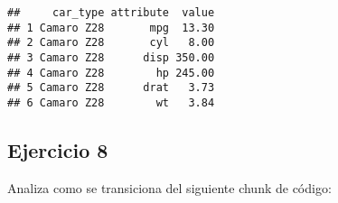 \documentclass[]{book}
\newenvironment{Shaded}{\begin{snugshade}}{\end{snugshade}}
\newcommand{\KeywordTok}[1]{\textcolor[rgb]{0.13,0.29,0.53}{\textbf{#1}}}
\newcommand{\NormalTok}[1]{#1}
\newcommand{\OperatorTok}[1]{\textcolor[rgb]{0.81,0.36,0.00}{\textbf{#1}}}
\newcommand{\StringTok}[1]{\textcolor[rgb]{0.31,0.60,0.02}{#1}}
\begin{document}
\begin{Shaded}
\end{Shaded}

\begin{verbatim}
##     car_type attribute  value
## 1 Camaro Z28       mpg  13.30
## 2 Camaro Z28       cyl   8.00
## 3 Camaro Z28      disp 350.00
## 4 Camaro Z28        hp 245.00
## 5 Camaro Z28      drat   3.73
## 6 Camaro Z28        wt   3.84
\end{verbatim}

\begin{Shaded}
\end{Shaded}

\hypertarget{ejercicio-8}{%
\subsection{Ejercicio 8}\label{ejercicio-8}}

Analiza como se transiciona del siguiente chunk de código:
\end{document}
